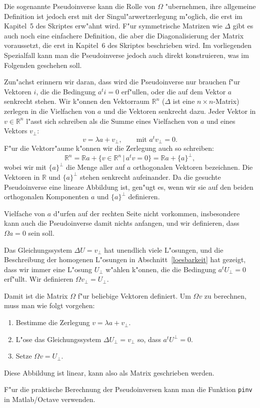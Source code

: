\documentclass[a4paper,12pt]{article}
\begin{document}
Die sogenannte Pseudoinverse kann die Rolle von $\Omega$ "ubernehmen, ihre
allgemeine Definition ist jedoch erst mit der Singul"arwertzerlegung
m"oglich, die erst im Kapitel~5 des Skriptes erw"ahnt wird.
F"ur symmetrische Matrizen wie $\Delta$ gibt es auch noch eine
einfachere Definition, die aber die Diagonalisierung der Matrix
voraussetzt, die erst in Kapitel~6 des Skriptes beschrieben wird.
Im vorliegenden Spezialfall kann man die Pseudoinverse jedoch auch 
direkt konstruieren, was im Folgenden geschehen soll.

Zun"achst erinnern wir daran, dass wird die Pseudoinverse nur brauchen
f"ur Vektoren $i$, die die Bedingung $a^ti=0$ erf"ullen, oder die auf
dem Vektor $a$ senkrecht stehen.
Wir k"onnen den Vektorraum $\mathbb R^n$ ($\Delta$ ist eine $n\times n$-Matrix)
zerlegen in die Vielfachen von $a$ und die Vektoren senkrecht dazu.
Jeder Vektor in $v\in\mathbb R^n$ l"asst sich schreiben als die Summe
eines Vielfachen von $a$ und eines Vektors $v_{\perp}$:
\[
v=\lambda a + v_{\perp},\qquad\text{mit $a^tv_{\perp}=0$}.
\]
F"ur die Vektorr"aume k"onnen wir die Zerlegung auch so schreiben:
\[
\mathbb R^n = \mathbb R a+\{v\in\mathbb R^n\,|\, a^tv=0\}
=
\mathbb Ra+\{a\}^{\perp},
\]
wobei wir mit $\{a\}^{\perp}$ die Menge aller auf $a$ orthogonalen
Vektoren bezeichnen.
Die Vektoren in $\mathbb R$ und $\{a\}^{\perp}$ stehen senkrecht
aufeinander.
Da die gesuchte Pseudoinverse eine lineare Abbildung ist, gen"ugt es,
wenn wir sie auf den beiden orthogonalen Komponenten $a$ und $\{a\}^{\perp}$
definieren.

Vielfache von $a$ d"urfen auf der rechten Seite nicht vorkommen, insbesondere
kann auch die Pseudoinverse damit nichts anfangen, und wir definieren,
dass $\Omega a=0$ sein soll.

Das Gleichungssystem $\Delta U=v_{\perp}$ hat unendlich viele L"osungen,
und die Beschreibung der homogenen L"osungen in Abschnitt~\ref{loesbarkeit}
hat gezeigt, dass wir immer eine L"osung $U_{\perp}$ w"ahlen k"onnen,
die die Bedingung $a^tU_{\perp}=0$ erf"ullt.
Wir definieren $\Omega v_{\perp}=U_{\perp}$.

Damit ist die Matrix $\Omega$ f"ur beliebige Vektoren definiert.
Um $\Omega v$  zu berechnen, muss man wie folgt vorgehen:
\begin{enumerate}
\item
Bestimme die Zerlegung $v=\lambda a +v_{\perp}$.
\item
L"ose das Gleichungssystem
$\Delta U_{\perp}=v_{\perp}$ so, dass
$a^tU^{\perp}=0$.
\item
Setze $\Omega v=U_{\perp}$.
\end{enumerate}
Diese Abbildung ist linear, kann also als Matrix geschrieben werden.

F"ur die praktische Berechnung der Pseudoinversen kann man die Funktion
{\tt pinv} in Matlab/Octave verwenden.
\end{document}
